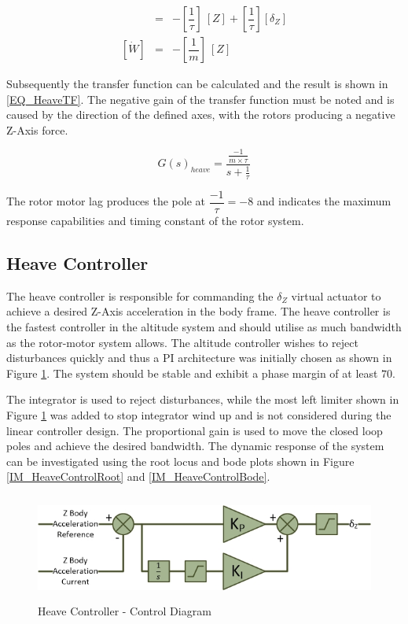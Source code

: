 \documentclass[12pt]{report}
\begin{document}
\begin{eqnarray}
[\dot{Z}] &=& - [\dfrac{1}{\tau}] \ [Z] + [\dfrac{1}{\tau}] [\delta_Z]\label{EQ_HeaveStateSpace1}\\\label{EQ_HeaveStateSpace11}
[\dot{W}] &=& - [\dfrac{1}{m}] \ [Z]\label{EQ_HeaveStateSpace2}
\end{eqnarray}

Subsequently the transfer function can be calculated and the result is shown in \eqref{EQ_HeaveTF}. The negative gain of the transfer function must be noted and is caused by the direction of the defined axes, with the rotors producing a negative Z-Axis force.

\begin{equation}
G(s)_{heave} = \frac{\frac{-1}{m \times \tau}}{s + \frac{1}{\tau}}\label{EQ_HeaveTF}
\end{equation}

The rotor motor lag produces the pole at $\dfrac{-1}{\tau} = -8$ and indicates the maximum response capabilities and timing constant of the rotor system.

\subsection{Heave Controller}
The heave controller is responsible for commanding the $\delta_Z$ virtual actuator to achieve a desired Z-Axis acceleration in the body frame. The heave controller is the fastest controller in the altitude system and should utilise as much bandwidth as the rotor-motor system allows. The altitude controller wishes to reject disturbances quickly and thus a PI architecture was initially chosen as shown in Figure \ref{IM_HeaveController}. The system should be stable and exhibit a phase margin of at least $70$\textdegree.

The integrator is used to reject disturbances, while the most left limiter shown in Figure \ref{IM_HeaveController} was added to stop integrator wind up and is not considered during the linear controller design. The proportional gain is used to move the closed loop poles and achieve the desired bandwidth. The dynamic response of the system can be investigated using the root locus and bode plots shown in Figure \ref{IM_HeaveControlRoot} and \ref{IM_HeaveControlBode}. 

\begin{figure}[H]
	\centering
	\includegraphics[height = 3.5cm]{../References/Diagrams/HeaveController.jpg}
	\caption{Heave Controller -  Control Diagram}
	\label{IM_HeaveController}
\end{figure}
\end{document}
